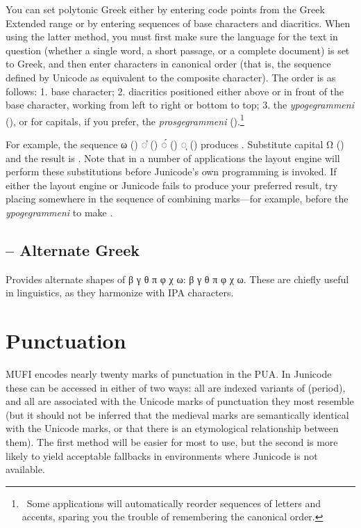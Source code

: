 You can set polytonic Greek either by entering code points from the Greek
Extended range or by entering sequences of base characters and diacritics.
When using the latter method, you must first make sure the language for the
text in question (whether a single word, a short passage, or a complete
document) is set to Greek, and then enter characters in canonical order
(that is, the sequence defined by Unicode as equivalent to the composite
character). The order is as follows: 1. base character; 2. diacritics
positioned either above or in front of the base character, working from left
to right or bottom to top; 3. the \textit{ypogegrammeni} (), or for
capitals, if you prefer, the \textit{prosgegrammeni} ().\footnote{\ Some
applications will automatically reorder sequences of letters and accents,
sparing you the trouble of remembering the canonical order.}

For example, the sequence ω () ◌̓ () ◌́ () ◌ͅ ()
produces .
Substitute capital Ω () and the result is
. Note that in a number of applications the layout
engine will perform these substitutions before Junicode’s own programming is
invoked. If either the layout engine or Junicode fails to produce your
preferred result, try placing   somewhere
in the sequence of combining marks---for example, before the \textit{ypogegrammeni}
to make .

\subsection{ -- Alternate Greek}
Provides alternate shapes of {β γ θ π φ χ ω}:
{β γ θ π φ χ ω}.
These are chiefly useful in linguistics, as they harmonize with IPA characters.

\section{Punctuation}
MUFI encodes nearly twenty marks of punctuation in the PUA. In Junicode these can be accessed in
either of two ways: all are indexed variants of  (period), and all are associated with the Unicode marks of
punctuation they most resemble (but it should not be inferred that the medieval marks are semantically identical with
the Unicode marks, or that there is an etymological relationship between them). The first method will be easier for
most to use, but the second is more likely to yield acceptable fallbacks in environments where Junicode is not
available.

